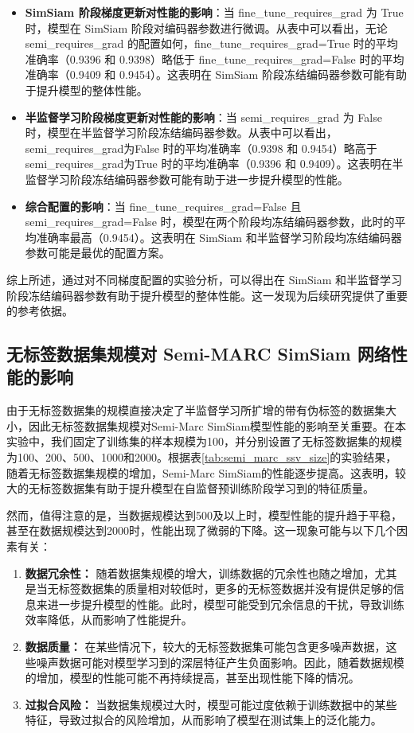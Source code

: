 \documentclass[master]{thesis-uestc}
\begin{document}
\begin{itemize}
    \item \textbf{SimSiam 阶段梯度更新对性能的影响}：当 fine\_tune\_requires\_grad 为 True 时，模型在 SimSiam 阶段对编码器参数进行微调。从表中可以看出，无论 semi\_requires\_grad 的配置如何，fine\_tune\_requires\_grad=True 时的平均准确率（0.9396 和 0.9398）略低于 fine\_tune\_requires\_grad=False 时的平均准确率（0.9409 和 0.9454）。这表明在 SimSiam 阶段冻结编码器参数可能有助于提升模型的整体性能。

    \item \textbf{半监督学习阶段梯度更新对性能的影响}：当 semi\_requires\_grad 为 False 时，模型在半监督学习阶段冻结编码器参数。从表中可以看出，semi\_requires\_grad为False 时的平均准确率（0.9398 和 0.9454）略高于 semi\_requires\_grad为True 时的平均准确率（0.9396 和 0.9409）。这表明在半监督学习阶段冻结编码器参数可能有助于进一步提升模型的性能。

    \item \textbf{综合配置的影响}：当 fine\_tune\_requires\_grad=False 且 semi\_requires\_grad=False 时，模型在两个阶段均冻结编码器参数，此时的平均准确率最高（0.9454）。这表明在 SimSiam 和半监督学习阶段均冻结编码器参数可能是最优的配置方案。
\end{itemize}

综上所述，通过对不同梯度配置的实验分析，可以得出在 SimSiam 和半监督学习阶段冻结编码器参数有助于提升模型的整体性能。这一发现为后续研究提供了重要的参考依据。

\subsection{无标签数据集规模对 Semi-MARC SimSiam 网络性能的影响}
由于无标签数据集的规模直接决定了半监督学习所扩增的带有伪标签的数据集大小，因此无标签数据集规模对Semi-Marc SimSiam模型性能的影响至关重要。在本实验中，我们固定了训练集的样本规模为100，并分别设置了无标签数据集的规模为100、200、500、1000和2000。根据表\ref{tab:semi_marc_ssv_size}的实验结果，随着无标签数据集规模的增加，Semi-Marc SimSiam的性能逐步提高。这表明，较大的无标签数据集有助于提升模型在自监督预训练阶段学习到的特征质量。

然而，值得注意的是，当数据规模达到500及以上时，模型性能的提升趋于平稳，甚至在数据规模达到2000时，性能出现了微弱的下降。这一现象可能与以下几个因素有关：

\begin{enumerate}
    \item \textbf{数据冗余性：} 随着数据集规模的增大，训练数据的冗余性也随之增加，尤其是当无标签数据集的质量相对较低时，更多的无标签数据并没有提供足够的信息来进一步提升模型的性能。此时，模型可能受到冗余信息的干扰，导致训练效率降低，从而影响了性能提升。
    \item \textbf{数据质量：} 在某些情况下，较大的无标签数据集可能包含更多噪声数据，这些噪声数据可能对模型学习到的深层特征产生负面影响。因此，随着数据规模的增加，模型的性能可能不再持续提高，甚至出现性能下降的情况。
    \item \textbf{过拟合风险：} 当数据集规模过大时，模型可能过度依赖于训练数据中的某些特征，导致过拟合的风险增加，从而影响了模型在测试集上的泛化能力。
\end{enumerate}
\end{document}
